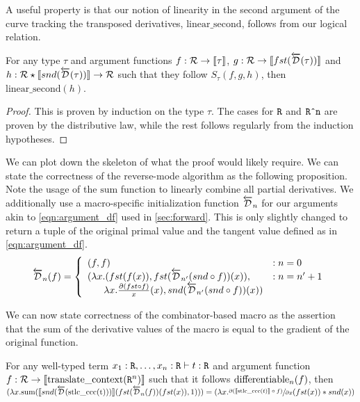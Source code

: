   A useful property is that our notion of linearity in the second argument of the curve tracking the transposed derivatives, $\text{linear\_second}$, follows from our logical relation.
  \begin{lemma}
    For any type $\tau$ and argument functions $f : \mathcal{R} \rightarrow \llbracket \tau \rrbracket$, $g : \mathcal{R} \rightarrow \llbracket fst(\overleftarrow{\mathcal{D}}(\tau))\rrbracket$ and $h : \mathcal{R} \star \llbracket snd(\overleftarrow{\mathcal{D}}(\tau)) \rrbracket \rightarrow \mathcal{R}$ such that they follow $S_\tau(f, g, h)$, then $\text{linear\_second}(h)$.
  \end{lemma}
  \begin{proof}
    This is proven by induction on the type $\tau$.
    The cases for $\texttt{R}$ and $\texttt{R\^{}n}$ are proven by the distributive law, while the rest follows regularly from the induction hypotheses.
  \end{proof}

  We can plot down the skeleton of what the proof would likely require.
  We can state the correctness of the reverse-mode algorithm as the following proposition.
  Note the usage of the $\text{sum}$ function to linearly combine all partial derivatives.
  We additionally use a macro-specific initialization function $\overleftarrow{\mathcal{D}}_n$ for our arguments akin to \cref{eqn:argument_df} used in \cref{sec:forward}.
  This is only slightly changed to return a tuple of the original primal value and the tangent value defined as in \cref{eqn:argument_df}.
  \begin{equation*}
    \overleftarrow{\mathcal{D}}_n(f) =
      \left\{
        \begin{array}{ll}
          (f, f) & : n = 0 \\
          (\lambda x. (fst(f(x)), fst(\overleftarrow{\mathcal{D}}_{n'}(snd \circ f))(x)), & : n = n' + 1 \\
          \;\;\;\;\;\; \lambda x. \frac{\partial{(fst \circ f)}}{x}(x), snd(\overleftarrow{\mathcal{D}}_{n'}(snd\circ f))(x))
        \end{array}
      \right.
  \label{eqn:argument_df_rev}
  \end{equation*}

  We can now state correctness of the combinator-based macro as the assertion that the sum of the derivative values of the macro is equal to the gradient of the original function.
  \begin{proposition}
    For any well-typed term $x_1 : \texttt{R}, \dots, x_n : \texttt{R} \vdash t : \texttt{R}$ and argument function $f :  \mathcal{R} \rightarrow \llbracket \text{translate\_context}(\texttt{R}^n) \rrbracket$ such that it follows $\text{differentiable}_{n}(f)$, then $(\lambda x. \text{sum}(\llbracket snd(\overleftarrow{\mathcal{D}}(\text{stlc\_ccc(t)}))\rrbracket (fst(\overleftarrow{\mathcal{D}}_n(f)) (fst(x)), 1))) = (\lambda x. \sfrac{\partial{(\llbracket\text{stlc\_ccc}(t)\rrbracket \circ f)}}{\partial{x}}(fst(x)) * snd(x))$
  \end{proposition}

